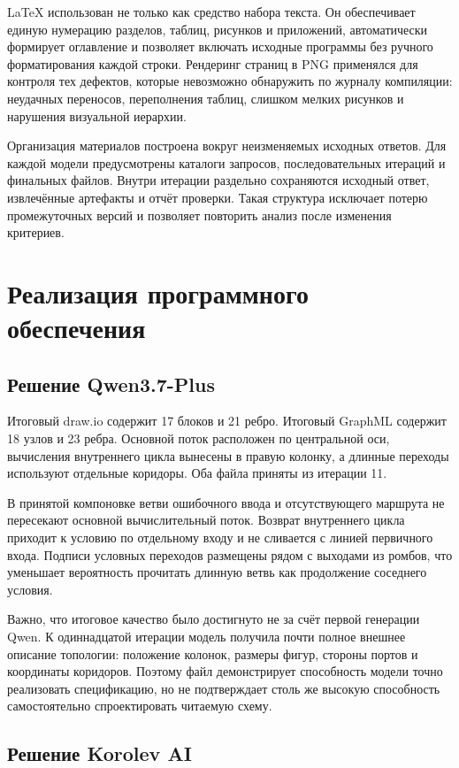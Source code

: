\documentclass[a4paper,12pt]{extreport}
\begin{document}
LaTeX использован не только как средство набора текста. Он обеспечивает единую нумерацию разделов, таблиц, рисунков и приложений, автоматически формирует оглавление и позволяет включать исходные программы без ручного форматирования каждой строки. Рендеринг страниц в PNG применялся для контроля тех дефектов, которые невозможно обнаружить по журналу компиляции: неудачных переносов, переполнения таблиц, слишком мелких рисунков и нарушения визуальной иерархии.

Организация материалов построена вокруг неизменяемых исходных ответов. Для каждой модели предусмотрены каталоги запросов, последовательных итераций и финальных файлов. Внутри итерации раздельно сохраняются исходный ответ, извлечённые артефакты и отчёт проверки. Такая структура исключает потерю промежуточных версий и позволяет повторить анализ после изменения критериев.

\section{Реализация программного обеспечения}

\subsection{Решение Qwen3.7-Plus}

Итоговый draw.io содержит 17 блоков и 21 ребро. Итоговый GraphML содержит 18 узлов и 23 ребра. Основной поток расположен по центральной оси, вычисления внутреннего цикла вынесены в правую колонку, а длинные переходы используют отдельные коридоры. Оба файла приняты из итерации 11.

В принятой компоновке ветви ошибочного ввода и отсутствующего маршрута не пересекают основной вычислительный поток. Возврат внутреннего цикла приходит к условию по отдельному входу и не сливается с линией первичного входа. Подписи условных переходов размещены рядом с выходами из ромбов, что уменьшает вероятность прочитать длинную ветвь как продолжение соседнего условия.

Важно, что итоговое качество было достигнуто не за счёт первой генерации Qwen. К одиннадцатой итерации модель получила почти полное внешнее описание топологии: положение колонок, размеры фигур, стороны портов и координаты коридоров. Поэтому файл демонстрирует способность модели точно реализовать спецификацию, но не подтверждает столь же высокую способность самостоятельно спроектировать читаемую схему.

\subsection{Решение Korolev AI}
\end{document}
